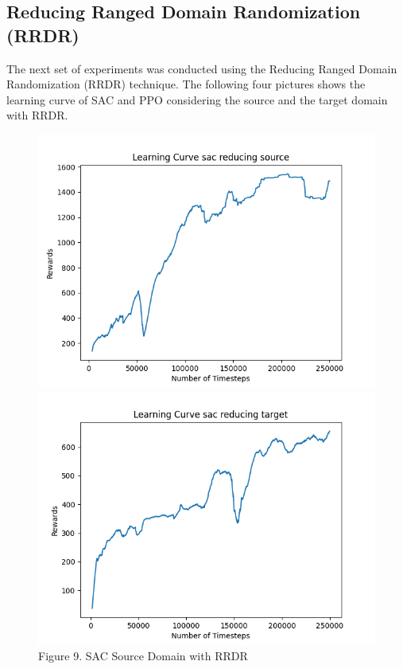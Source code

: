 \documentclass[12pt]{article}
\begin{document}
\subsection{Reducing Ranged Domain Randomization (RRDR)}

The next set of experiments was conducted using the Reducing Ranged Domain Randomization (RRDR) technique. The following four pictures shows the learning curve of SAC and PPO considering the source and the target domain with RRDR.

\begin{figure}[H]
    \centering
    \begin{minipage}{0.45\textwidth}
        \centering
        \includegraphics[width=\textwidth]{../images/Learning_Curve_SAC_Reducing_Source.png}
        \caption{Figure 9. SAC Source Domain with RRDR}
        \label{fig:sac_source_rrdr}
    \end{minipage}
    \hfill
    \begin{minipage}{0.45\textwidth}
        \centering
        \includegraphics[width=\textwidth]{../images/Learning_Curve_SAC_Reducing_Target.png}

\end{minipage}
\end{figure}
\end{document}
